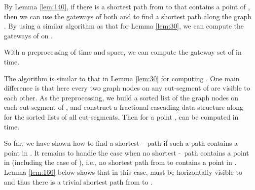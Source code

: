 \documentclass[english,runningheads,11pt]{llncs}
\def\st{-}
\newenvironment{proof}{\noindent {\textbf{Proof:}}\rm}{\hfill \rm}
\begin{document}
By Lemma \ref{lem:140}, if there is a shortest path from  to 
that contains a
point of , then we can use the gateways
of both  and  to find a shortest path along the graph .
By using a similar algorithm as that for Lemma \ref{lem:30}, we can
compute the gateways of  on .

\begin{lemma}\label{lem:150}
With a preprocessing of  time and
 space,  we
can compute the gateway set  of  in  time.
\end{lemma}
\begin{proof}
The algorithm is similar to that in Lemma \ref{lem:30} for computing
. One main difference is that here every two graph
nodes on any cut-segment of  are visible to each other.
As the preprocessing, we build a sorted list of the graph nodes on each
cut-segment of , and construct a fractional cascading data
structure \cite{ref:ChazelleFr86} along  for the sorted lists of all
cut-segments. Then for a point
,  can be computed in  time.
\end{proof}

So far, we have shown how to find a shortest \st\ path if such a path
contains a point in .
It remains to handle the case when
no shortest \st\ path contains a point in
 (including the case of
), i.e.,
no shortest path from  to  contains a point in
.
Lemma \ref{lem:160} below shows that in this case,  must be horizontally
visible to  and thus there is a trivial shortest
path from  to .
\end{document}
